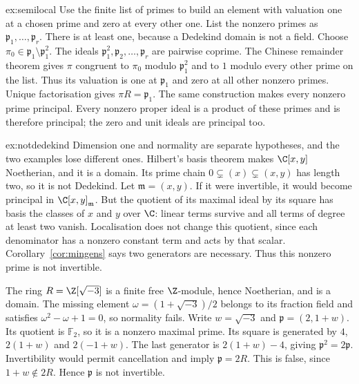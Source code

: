 \begin{solution}{ex:semilocal}
\idea Use the finite list of primes to build an element with valuation one at a chosen prime and zero at every other one.
\writeup List the nonzero primes as $\mathfrak p_1,\ldots,\mathfrak p_r$. There is at least one, because a Dedekind domain is not a field. Choose $\pi_0\in\mathfrak p_1\setminus\mathfrak p_1^2$. The ideals $\mathfrak p_1^2,\mathfrak p_2,\ldots,\mathfrak p_r$ are pairwise coprime. The Chinese remainder theorem gives $\pi$ congruent to $\pi_0$ modulo $\mathfrak p_1^2$ and to $1$ modulo every other prime on the list. Thus its valuation is one at $\mathfrak p_1$ and zero at all other nonzero primes. Unique factorisation gives $\pi R=\mathfrak p_1$. The same construction makes every nonzero prime principal. Every nonzero proper ideal is a product of these primes and is therefore principal; the zero and unit ideals are principal too.
\end{solution}

\begin{solution}{ex:notdedekind}
\idea Dimension one and normality are separate hypotheses, and the two examples lose different ones.
\writeup Hilbert's basis theorem makes $\C[x,y]$ Noetherian, and it is a domain. Its prime chain $0\subsetneq(x)\subsetneq(x,y)$ has length two, so it is not Dedekind. Let $\mathfrak m=(x,y)$. If it were invertible, it would become principal in $\C[x,y]_{\mathfrak m}$. But the quotient of its maximal ideal by its square has basis the classes of $x$ and $y$ over $\C$: linear terms survive and all terms of degree at least two vanish. Localisation does not change this quotient, since each denominator has a nonzero constant term and acts by that scalar. Corollary~\ref{cor:mingens} says two generators are necessary. Thus this nonzero prime is not invertible.

The ring $R=\Z[\sqrt{-3}]$ is a finite free $\Z$-module, hence Noetherian, and is a domain. The missing element $\omega=(1+\sqrt{-3})/2$ belongs to its fraction field and satisfies $\omega^2-\omega+1=0$, so normality fails. Write $w=\sqrt{-3}$ and $\mathfrak p=(2,1+w)$. Its quotient is $\mathbb F_2$, so it is a nonzero maximal prime. Its square is generated by $4$, $2(1+w)$ and $2(-1+w)$. The last generator is $2(1+w)-4$, giving $\mathfrak p^2=2\mathfrak p$. Invertibility would permit cancellation and imply $\mathfrak p=2R$. This is false, since $1+w\notin2R$. Hence $\mathfrak p$ is not invertible.
\end{solution}

